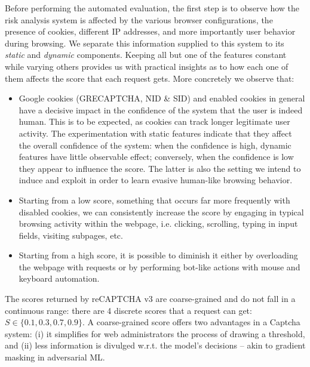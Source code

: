 Before performing the automated evaluation, the first step is to observe how the risk analysis system is affected by the various browser configurations, the presence of cookies, different IP addresses, and more importantly user behavior during browsing.
We separate this information supplied to this system to its \emph{static} and \emph{dynamic} components.
Keeping all but one of the features constant while varying others provides us with practical insights as to how each one of them affects the score that each request gets.
More concretely we observe that:

\begin{itemize}
  \item Google cookies (GRECAPTCHA, NID \& SID) and enabled cookies in general have a decisive impact in the confidence of the system that the user is indeed human. This is to be expected, as cookies can track longer legitimate user activity.
  The experimentation with static features indicate that they affect the overall confidence of the system: when the confidence is high, dynamic features have little observable effect; conversely, when the confidence is low they appear to influence the score.
  The latter is also the setting we intend to induce and exploit in order to learn evasive human-like browsing behavior.
  \item Starting from a low score, something that occurs far more frequently with disabled cookies, we can consistently increase the score by engaging in typical browsing activity within the webpage, i.e. clicking, scrolling, typing in input fields, visiting subpages, etc.
  \item Starting from a high score, it is possible to diminish it either by overloading the webpage with requests or by performing bot-like actions with mouse and keyboard automation.
\end{itemize}

The scores returned by reCAPTCHA v3 are coarse-grained and do not fall in a continuous range: there are 4 discrete scores that a request can get: $S \in \{0.1, 0.3, 0.7, 0.9\}$.
A coarse-grained score offers two advantages in a Captcha system: (i) it simplifies for web administrators the process of drawing a threshold, and (ii) less information is divulged w.r.t. the model's decisions -- akin to gradient masking in adversarial \gls{ML}.

